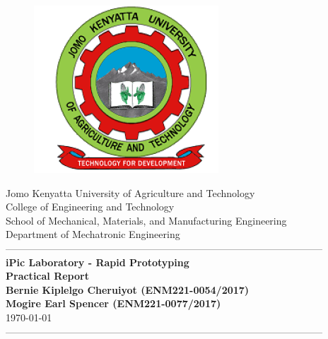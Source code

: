 \documentclass[12pt,fleqn]{article}
\begin{document}
\begin{titlepage}
  \begin{center}
      \vspace*{-4.0cm}
    \begin{figure}[!h]
\centering
\includegraphics[width=0.3 \linewidth] {Figures/JKUAT_logo}
\label{fig:jomologo}
\end{figure}
   \large{Jomo Kenyatta University of Agriculture and Technology}\\
    \large{College of Engineering and Technology}\\
    \large{School of Mechanical, Materials, and Manufacturing Engineering}\\
   \large{Department of Mechatronic Engineering}\\

    ------------------------------------------------------------------------------------------------\\[1.0cm]
    \LARGE{\textbf{iPic Laboratory - Rapid Prototyping}}\\[0.6cm]
    \LARGE{\textbf{Practical Report
            }}\\[1.5cm]

    \vspace{0.5cm}
    \large{\textbf{Bernie Kiplelgo Cheruiyot (ENM221-0054/2017)
            }}\\
     \large{\textbf{Mogire Earl Spencer (ENM221-0077/2017)
            }}\\[1.0cm]
    \large{\small{\today}}\\
    ------------------------------------------------------------------------------------------------\\[1.5cm]
  \end{center}
\end{titlepage}
\end{document}
